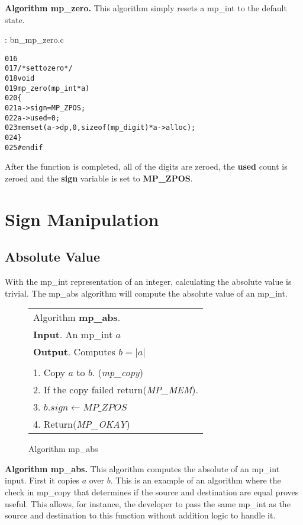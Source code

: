 \documentclass[b5paper]{book}
\begin{document}
\textbf{Algorithm mp\_zero.}
This algorithm simply resets a mp\_int to the default state.  

\vspace{+3mm}\begin{small}
\hspace{-5.1mm}{\bf File}: bn\_mp\_zero.c
\vspace{-3mm}
\begin{alltt}
016   
017   /* set to zero */
018   void
019   mp_zero (mp_int * a)
020   \{
021     a->sign = MP_ZPOS;
022     a->used = 0;
023     memset (a->dp, 0, sizeof (mp_digit) * a->alloc);
024   \}
025   #endif
\end{alltt}
\end{small}

After the function is completed, all of the digits are zeroed, the \textbf{used} count is zeroed and the 
\textbf{sign} variable is set to \textbf{MP\_ZPOS}.

\section{Sign Manipulation}
\subsection{Absolute Value}
With the mp\_int representation of an integer, calculating the absolute value is trivial.  The mp\_abs algorithm will compute
the absolute value of an mp\_int.

\newpage\begin{figure}[here]
\begin{center}
\begin{tabular}{l}
\hline Algorithm \textbf{mp\_abs}. \\
\textbf{Input}.   An mp\_int $a$ \\
\textbf{Output}.  Computes $b = \vert a \vert$ \\
\hline \\
1.  Copy $a$ to $b$.  (\textit{mp\_copy}) \\
2.  If the copy failed return(\textit{MP\_MEM}). \\
3.  $b.sign \leftarrow MP\_ZPOS$ \\
4.  Return(\textit{MP\_OKAY}) \\
\hline
\end{tabular}
\end{center}
\caption{Algorithm mp\_abs}
\end{figure}

\textbf{Algorithm mp\_abs.}
This algorithm computes the absolute of an mp\_int input.  First it copies $a$ over $b$.  This is an example of an
algorithm where the check in mp\_copy that determines if the source and destination are equal proves useful.  This allows,
for instance, the developer to pass the same mp\_int as the source and destination to this function without addition 
logic to handle it.
\end{document}
